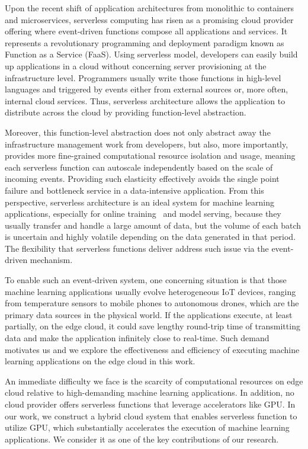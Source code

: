 Upon the recent shift of application architectures from monolithic to containers and microservices, serverless computing has risen as a promising cloud provider offering where event-driven functions compose all applications and services. It represents a revolutionary programming and deployment paradigm known as Function as a Service (FaaS). Using serverless model, developers can easily build up applications in a cloud without concerning server provisioning at the infrastructure level. Programmers usually write those functions in high-level languages and triggered by events either from external sources or, more often, internal cloud services. Thus, serverless architecture allows the application to distribute across the cloud by providing function-level abstraction.

Moreover, this function-level abstraction does not only abstract away the infrastructure management work from developers, but also, more importantly, provides more fine-grained computational resource isolation and usage, meaning each serverless function can autoscale independently based on the scale of incoming events. Providing such elasticity effectively avoids the single point failure and bottleneck service in a data-intensive application. From this perspective, serverless architecture is an ideal system for machine learning applications, especially for online training~\cite{ref:online} and model serving, because they usually transfer and handle a large amount of data, but the volume of each batch is uncertain and highly volatile depending on the data generated in that period. The flexibility that serverless functions deliver address such issue via the event-driven mechanism. 

To enable such an event-driven system, one concerning situation is that those machine learning applications usually evolve heterogeneous IoT devices, ranging from temperature sensors to mobile phones to autonomous drones, which are the primary data sources in the physical world. If the applications execute, at least partially, on the edge cloud, it could save lengthy round-trip time of transmitting data and make the application infinitely close to real-time. Such demand motivates us and we explore the effectiveness and efficiency of executing machine learning applications on the edge cloud in this work. 

An immediate difficulty we face is the scarcity of computational resources on edge cloud relative to high-demanding machine learning applications. In addition, no cloud provider offers serverless functions that leverage accelerators like GPU. In our work, we construct a hybrid cloud system that enables serverless function to utilize GPU, which substantially accelerates the execution of machine learning applications. We consider it as one of the key contributions of our research.

